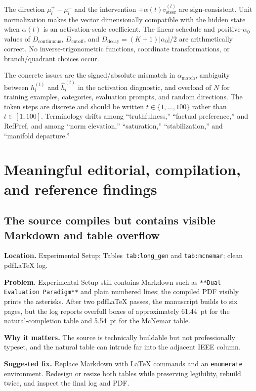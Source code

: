 \documentclass[11pt]{article}
\newcommand{\findinglabel}[1]{\textbf{#1}}
\begin{document}
The direction $\mu_l^+-\mu_l^-$ and the intervention $+\alpha(t)v_{\text{steer}}^{(l)}$ are sign-consistent.  Unit normalization makes the vector dimensionally compatible with the hidden state when $\alpha(t)$ is an activation-scale coefficient.  The linear schedule and positive-$\alpha_0$ values of $D_{\text{continuous}}$, $D_{\text{cutoff}}$, and $D_{\text{decay}}=(K+1)|\alpha_0|/2$ are arithmetically correct.  No inverse-trigonometric functions, coordinate transformations, or branch/quadrant choices occur.

The concrete issues are the signed/absolute mismatch in $\alpha_{\text{match}}$, ambiguity between $h_l^{(t)}$ and $\hat h_l^{(t)}$ in the activation diagnostic, and overload of $N$ for training examples, categories, evaluation prompts, and random directions.  The token steps are discrete and should be written $t\in\{1,\ldots,100\}$ rather than $t\in[1,100]$.  Terminology drifts among ``truthfulness,'' ``factual preference,'' and RefPref, and among ``norm elevation,'' ``saturation,'' ``stabilization,'' and ``manifold departure.''

\section*{Meaningful editorial, compilation, and reference findings}

\subsection*{The source compiles but contains visible Markdown and table overflow}

\findinglabel{Location.} Experimental Setup; Tables~\texttt{tab:long\_gen} and \texttt{tab:mcnemar}; clean pdfLaTeX log.

\findinglabel{Problem.} Experimental Setup still contains Markdown such as \verb|**Dual-Evaluation Paradigm**| and plain numbered lines; the compiled PDF visibly prints the asterisks.  After two pdfLaTeX passes, the manuscript builds to six pages, but the log reports overfull boxes of approximately 61.44~pt for the natural-completion table and 5.54~pt for the McNemar table.

\findinglabel{Why it matters.} The source is technically buildable but not professionally typeset, and the natural table can intrude far into the adjacent IEEE column.

\findinglabel{Suggested fix.} Replace Markdown with LaTeX commands and an \texttt{enumerate} environment.  Redesign or resize both tables while preserving legibility, rebuild twice, and inspect the final log and PDF.
\end{document}

